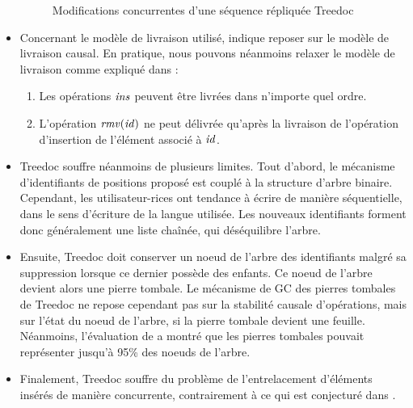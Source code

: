 \begin{itemize}
\begin{figure}[!ht]
{
      }
      \caption{Modifications concurrentes d'une séquence répliquée Treedoc}
      \label{fig:treedoc}
    \end{figure}
  \item Concernant le modèle de livraison utilisé, \cite{2009-treedoc-preguica} indique reposer sur le modèle de livraison causal.
    En pratique, nous pouvons néanmoins relaxer le modèle de livraison comme expliqué dans \cite{2021-these-vic} :
    \begin{enumerate}[label=(\roman*)]
      \item Les opérations $\mathit{ins}$ peuvent être livrées dans n'importe quel ordre.
      \item L'opération $\mathit{rmv}(\mathit{id})$ ne peut délivrée qu'après la livraison de l'opération d'insertion de l'élément associé à $\mathit{id}$.
    \end{enumerate}
  \item Treedoc souffre néanmoins de plusieurs limites.
    Tout d'abord, le mécanisme d'identifiants de positions proposé est couplé à la structure d'arbre binaire.
    Cependant, les utilisateur-rices ont tendance à écrire de manière séquentielle, \ie dans le sens d'écriture de la langue utilisée.
    Les nouveaux identifiants forment donc généralement une liste chaînée, qui déséquilibre l'arbre.
  \item Ensuite, Treedoc doit conserver un noeud de l'arbre des identifiants malgré sa suppression lorsque ce dernier possède des enfants.
    Ce noeud de l'arbre devient alors une pierre tombale.
    Le mécanisme de \ac{GC} des pierres tombales de Treedoc ne repose cependant pas sur la stabilité causale d'opérations, mais sur l'état du noeud de l'arbre, \ie si la pierre tombale devient une feuille.
    Néanmoins, l'évaluation de \cite{2009-treedoc-preguica} a montré que les pierres tombales pouvait représenter jusqu'à 95\% des noeuds de l'arbre.
  \item Finalement, Treedoc souffre du problème de l'entrelacement d'éléments insérés de manière concurrente, contrairement à ce qui est conjecturé dans \cite{2019-interleaving-anomalies-collaborative-editors-kleppmann}.
\end{itemize}
